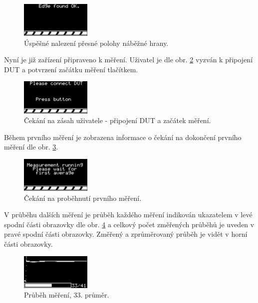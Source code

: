 \begin{figure}[H]
\includegraphics[width=0.3\textwidth,keepaspectratio,interpolate=false]{images/edge_found.png}\caption{Úspěšné nalezení přesné polohy náběžné hrany.}\label{edge_found}
\end{figure}

Nyní je již zařízení připraveno k měření. Uživatel je dle obr. \ref{measurement_user_wait} vyzván k připojení DUT a potvrzení začátku měření tlačítkem.
\begin{figure}[H]
\includegraphics[width=0.3\textwidth,keepaspectratio,interpolate=false]{images/measurement_user_wait.png}\caption{Čekání na zásah uživatele - připojení DUT a začátek měření.}\label{measurement_user_wait}
\end{figure}

Během prvního měření je zobrazena informace o čekání na dokončení prvního měření dle obr. \ref{measurement_avg_wait}.
\begin{figure}[H]
\includegraphics[width=0.3\textwidth,keepaspectratio,interpolate=false]{images/measurement_avg_wait.png}\caption{Čekání na proběhnutí prvního měření.}\label{measurement_avg_wait}
\end{figure}

V průběhu dalších měření je průběh každého měření indikován ukazatelem v levé spodní části obrazovky dle obr. \ref{measurement_running} a celkový počet změřených průběhů je uveden v pravé spodní části obrazovky. Změřený a zprůměrovaný průběh je vidět v horní části obrazovky.
\begin{figure}[H]
\includegraphics[width=0.3\textwidth,keepaspectratio,interpolate=false]{images/measurement_running.png}\caption{Průběh měření, 33. průměr.}\label{measurement_running}
\end{figure}

